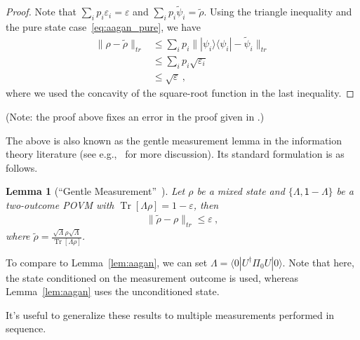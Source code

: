 \documentclass[12pt]{report}
\theoremstyle{plain}
\newtheorem{lemma}[theorem]{Lemma}
\theoremstyle{definition}
\newcommand{\eps}{\varepsilon}
\renewcommand{\bra}[1]{\langle#1|}
\renewcommand{\ket}[1]{|#1\rangle}
\newcommand{\ketbra}[2]{|#1\rangle\!\langle#2|}
\newcommand{\proj}[1]{\ketbra{#1}{#1}}
\newcommand{\Tr}{\operatorname{Tr}}
\begin{document}
\begin{proof}
 Note that $\sum_i p_i \eps_i = \eps$ and $\sum_{i} p_i \tilde{\psi}_i = \tilde{\rho}$. Using the triangle inequality and the pure state case~\eqref{eq:aagan_pure}, we have
\begin{align*}
\|\rho - \tilde{\rho} \|_{tr} &\leq \sum_i p_i \| \proj{\psi_i} - \tilde{\psi}_i \|_{tr} \\
&\leq \sum_{i} p_i \sqrt{\eps_i} \\
&\leq \sqrt{\eps} \ ,
\end{align*}
where we used the concavity of the square-root function in the last inequality.
\end{proof}

(Note: the proof above fixes an error in the proof given in \cite{aar:adv}.)

The above is also known as the gentle measurement lemma in the information theory literature (see e.g.,~\cite[Section 9.4]{wildebook} for more discussion). Its standard formulation is as follows.
\begin{lemma}[``Gentle Measurement''~\cite{gentle}]
Let $\rho$ be a mixed state and $\{\Lambda, \mathsf{1}-\Lambda\}$ be a two-outcome POVM with $\Tr[\Lambda \rho] = 1-\eps$, then
\begin{align*}
\| \tilde{\rho} - \rho \|_{tr} \leq \eps \ ,
\end{align*}
where $\tilde{\rho} = \frac{\sqrt{\Lambda} \rho \sqrt{\Lambda}}{\Tr[\Lambda \rho]}$.
\end{lemma}
To compare to Lemma~\ref{lem:aagan}, we can set $\Lambda = \bra{0} U^{\dagger} \Pi_0 U \ket{0}$. Note that here, the state conditioned on the measurement outcome is used, whereas Lemma~\ref{lem:aagan} uses the unconditioned state.

It's useful to generalize these results to multiple measurements performed in sequence.
\end{document}
